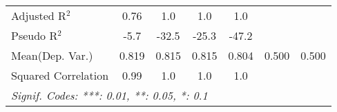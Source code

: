 \begin{tabular}{lcccccc}
   Adjusted R$^2$                                             & 0.76          & 1.0     & 1.0            & 1.0            &     & \\  
   Pseudo R$^2$                                               & -5.7          & -32.5   & -25.3          & -47.2          &     & \\  
Mean(Dep. Var.) & 0.819 & 0.815 & 0.815 & 0.804 & 0.500 & 0.500 \\
   Squared Correlation                                        & 0.99          & 1.0     & 1.0            & 1.0            &     & \\  
   \midrule \midrule
   \multicolumn{7}{l}{\emph{Signif. Codes: ***: 0.01, **: 0.05, *: 0.1}}\\
\end{tabular}
\par\endgroup
